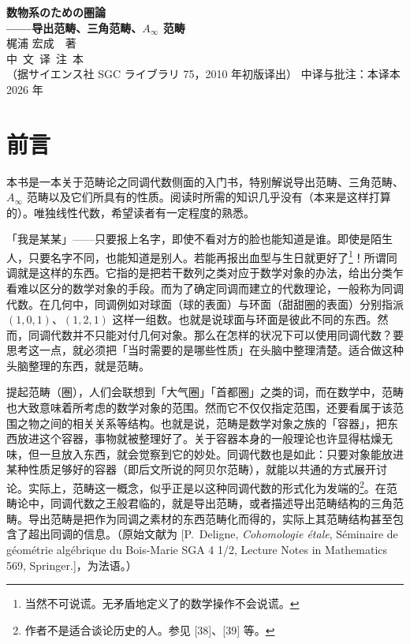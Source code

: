 \thispagestyle{empty}
\begin{center}
\vspace*{2.2cm}
{\Huge\bfseries 数物系のための圏論}\\[0.6cm]
{\Large\bfseries ——导出范畴、三角范畴、$A_\infty$ 范畴}\\[1.6cm]
{\large 梶浦 宏成\ \ 著}\\[2.4cm]
{\large 中\ 文\ 译\ 注\ 本}\\[0.8cm]
{\small（据サイエンス社 SGC ライブラリ 75，2010 年初版译出）}
\vfill
{\small 中译与批注：本译本\\[0.4em]
2026 年}
\end{center}
\clearpage

\chapter*{前言}

本书是一本关于范畴论之同调代数侧面的入门书，特别解说导出范畴、三角范畴、$A_\infty$ 范畴以及它们所具有的性质。阅读时所需的知识几乎没有（本来是这样打算的）。唯独线性代数，希望读者有一定程度的熟悉。

「我是某某」——只要报上名字，即使不看对方的脸也能知道是谁。即使是陌生人，只要名字不同，也能知道是别人。若能再报出血型与生日就更好了\footnote{当然不可说谎。无矛盾地定义了的数学操作不会说谎。}！所谓同调就是这样的东西。它指的是把若干数列之类对应于数学对象的办法，给出分类乍看难以区分的数学对象的手段。而为了确定同调而建立的代数理论，一般称为同调代数。在几何中，同调例如对球面（球的表面）与环面（甜甜圈的表面）分别指派 $(1,0,1)$、$(1,2,1)$ 这样一组数。也就是说球面与环面是彼此不同的东西。然而，同调代数并不只能对付几何对象。那么在怎样的状况下可以使用同调代数？要思考这一点，就必须把「当时需要的是哪些性质」在头脑中整理清楚。适合做这种头脑整理的东西，就是范畴。

提起范畴（圏），人们会联想到「大气圈」「首都圈」之类的词，而在数学中，范畴也大致意味着所考虑的数学对象的范围。然而它不仅仅指定范围，还要看属于该范围之物之间的相关关系等结构。也就是说，范畴是数学对象之族的「容器」，把东西放进这个容器，事物就被整理好了。关于容器本身的一般理论也许显得枯燥无味，但一旦放入东西，就会觉察到它的妙处。同调代数也是如此：只要对象能放进某种性质足够好的容器（即后文所说的阿贝尔范畴），就能以共通的方式展开讨论。实际上，范畴这一概念，似乎正是以这种同调代数的形式化为发端的\footnote{作者不是适合谈论历史的人。参见 [38]、[39] 等。}。在范畴论中，同调代数之王般君临的，就是导出范畴，或者描述导出范畴结构的三角范畴。导出范畴是把作为同调之素材的东西范畴化而得的，实际上其范畴结构甚至包含了超出同调的信息。（原始文献为 [P.~Deligne, \textit{Cohomologie \'etale}, S\'eminaire de g\'eom\'etrie alg\'ebrique du Bois-Marie SGA 4 1/2, Lecture Notes in Mathematics 569, Springer.]，为法语。）

